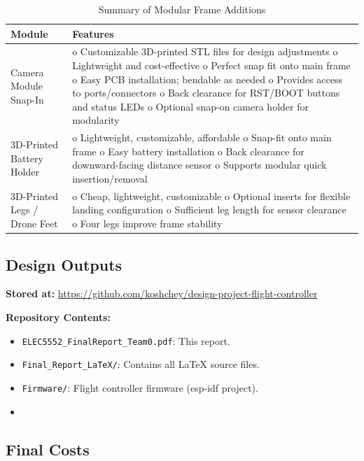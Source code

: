 \begin{table}[H]
\centering
\begin{tabular}{|p{3cm}|p{11cm}|}
\hline
\textbf{Module} & \textbf{Features} \\
\hline
Camera Module Snap-In &
o Customizable 3D-printed STL files for design adjustments \newline
o Lightweight and cost-effective \newline
o Perfect snap fit onto main frame \newline
o Easy PCB installation; bendable as needed \newline
o Provides access to ports/connectors \newline
o Back clearance for RST/BOOT buttons and status LEDs \newline
o Optional snap-on camera holder for modularity \\
\hline
3D-Printed Battery Holder & 
o Lightweight, customizable, affordable \newline
o Snap-fit onto main frame \newline
o Easy battery installation \newline
o Back clearance for downward-facing distance sensor \newline
o Supports modular quick insertion/removal \\
\hline
3D-Printed Legs / Drone Feet & 
o Cheap, lightweight, customizable \newline
o Optional inserts for flexible landing configuration \newline
o Sufficient leg length for sensor clearance \newline
o Four legs improve frame stability \\
\hline
\end{tabular}
\caption{Summary of Modular Frame Additions}
\label{tab:frame-add-summary}
\end{table}

\subsection{Design Outputs}
\textbf{Stored at:} \url{https://github.com/koshchey/design-project-flight-controller}

\textbf{Repository Contents:}
\begin{itemize}
    \item \texttt{ELEC5552\_FinalReport\_Team0.pdf}: This report.
    \item \texttt{Final\_Report\_LaTeX/}: Contains all \LaTeX{} source files.
    \item \texttt{Firmware/}: Flight controller firmware (\gls{esp-idf} project).
    \item {}
\end{itemize}

\subsection{Final Costs}
